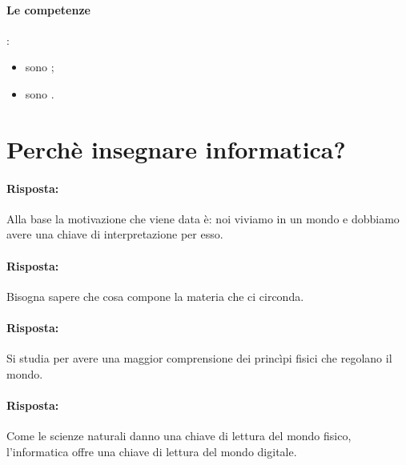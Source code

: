 \paragraph{Le competenze}:

\begin{itemize}
    \item {} sono ;
    \item {} sono .
\end{itemize}
\paragraph{}

\section{Perchè insegnare informatica?}


\paragraph{Risposta:} Alla base la motivazione che viene data è: noi viviamo in un mondo e dobbiamo avere una chiave di interpretazione per esso.


\paragraph{Risposta:} Bisogna sapere che cosa compone la materia che ci circonda.


\paragraph{Risposta:} Si studia per avere una maggior comprensione dei princìpi fisici che regolano il mondo.


\paragraph{Risposta: }Come le scienze naturali danno una chiave di lettura del mondo fisico, l'informatica offre una chiave di lettura del mondo digitale.

